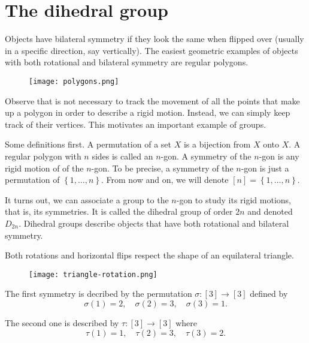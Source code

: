\documentclass[11pt,a4paper]{article}
\begin{document}
\def\contador{Lesson 4}


\section{The dihedral group}

Objects have bilateral
symmetry if they look the same when flipped over (usually in a specific direction, say vertically).
The easiest geometric examples of objects
with both rotational and bilateral symmetry are regular polygons.

\begin{figure}[!htb]
    \centering
    \texttt{[image: polygons.png]}
\end{figure}

Observe that is not necessary to track the movement of all the points that make up a  polygon in order to describe a rigid motion. 
Instead, we can simply keep track of their vertices.
This motivates  an important example of groups.

Some definitions first.
A permutation of a set \(X\) is a bijection from \(X\) onto \(X\).
A regular polygon with $n$ sides is called an $n$-gon.
A symmetry of the \(n\)-gon is any rigid motion of of the \(n\)-gon.
To be precise,  a symmetry of the \(n\)-gon is just a permutation of \(\left\{ 1,\ldots, n \right\}\). From now and on, we will denote \([n] = \left\{ 1,\ldots, n \right\}\).

It turns out, we can associate a group to the \(n\)-gon to study its rigid motions, that is, its symmetries.
It is called the dihedral group of order \(2n\) and denoted \(D_{2n}\).
Dihedral groups describe objects that have both rotational and bilateral symmetry.


\begin{exa}
    Both rotations and horizontal flips respect the shape of an equilateral triangle.

\begin{figure}[!htb]
    \centering
    \texttt{[image: triangle-rotation.png]}
\end{figure}

The first symmetry is decribed by the permutation \(\sigma\colon [3]\to [3]\) defined by 
\[\sigma(1)=2,\quad\sigma(2)=3,\quad \sigma(3) = 1.\]

The second one is described by \(\tau\colon [3]\to [3]\) where 
\[\tau(1)=1,\quad\tau(2)=3,\quad \tau(3) = 2.\]
\end{exa}
\end{document}
